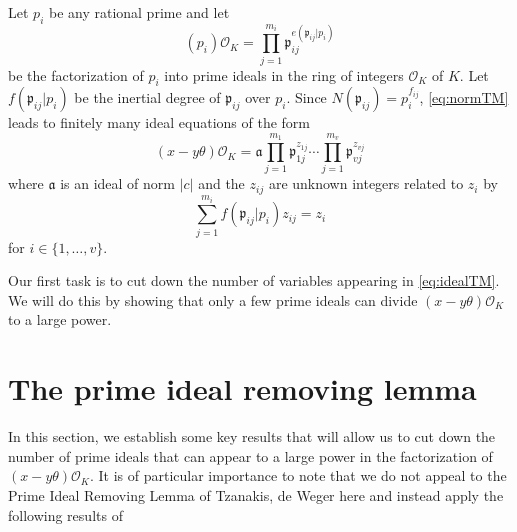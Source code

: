 Let $p_i$ be any rational prime and let 
\[(p_i)\mathcal{O}_K = \prod_{j = 1}^{m_i} \mathfrak{p}_{ij}^{e(\mathfrak{p}_{ij}|p_i)}\]
be the factorization of $p_i$ into prime ideals in the ring of integers $\mathcal{O}_K$ of $K$. Let $f(\mathfrak{p}_{ij}|p_i)$ be the inertial degree of $\mathfrak{p}_{ij}$ over $p_i$. Since $N(\mathfrak{p}_{ij}) = p_i^{f_{ij}}$, \eqref{eq:normTM} leads to finitely many ideal equations of the form
\begin{equation} \label{eq:idealTM}
(x-y\theta)\mathcal{O}_K = \mathfrak{a} \prod_{j = 1}^{m_1} \mathfrak{p}_{1j}^{z_{1j}} \cdots \prod_{j = 1}^{m_v} \mathfrak{p}_{vj}^{z_{vj}}
\end{equation}
where $\mathfrak{a}$ is an ideal of norm $|c|$ and the $z_{ij}$ are unknown integers related to $z_i$ by 
\[\sum_{j = 1}^{m_i} f(\mathfrak{p}_{ij}|p_i)z_{ij} = z_i\]
for $i \in \{1, \dots, v\}$.

Our first task is to cut down the number of variables appearing in \eqref{eq:idealTM}. We will do this by showing that only a few prime ideals can divide $(x-y\theta)\mathcal{O}_K$ to a large power. 


\section{The prime ideal removing lemma}
\label{sec:PIRL}

In this section, we establish some key results that will allow us to cut down the number of prime ideals that can appear to a large power in the factorization of $(x-y\theta)\mathcal{O}_K$. It is of particular importance to note that we do not appeal to the Prime Ideal Removing Lemma of Tzanakis, de Weger  here and instead apply the following results of 

